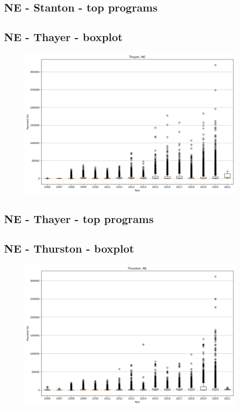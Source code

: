 \subsection*{NE - Stanton - top programs}

\newpage
\subsection*{NE - Thayer - boxplot}
\begin{figure}[h]
\centering
\includegraphics[width=7in]{../output/boxplots/counties/Thayer-NE_boxplot.png}
\end{figure}


\subsection*{NE - Thayer - top programs}

\newpage
\subsection*{NE - Thurston - boxplot}
\begin{figure}[h]
\centering
\includegraphics[width=7in]{../output/boxplots/counties/Thurston-NE_boxplot.png}
\end{figure}


